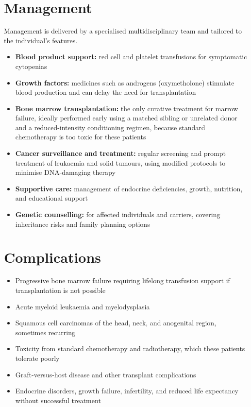 \section*{Management}
Management is delivered by a specialised multidisciplinary team and tailored to the individual's features.
\begin{itemize}
    \item \textbf{Blood product support:} red cell and platelet transfusions for symptomatic cytopenias
    \item \textbf{Growth factors:} medicines such as androgens (oxymetholone) stimulate blood production and can delay the need for transplantation
    \item \textbf{Bone marrow transplantation:} the only curative treatment for marrow failure, ideally performed early using a matched sibling or unrelated donor and a reduced-intensity conditioning regimen, because standard chemotherapy is too toxic for these patients
    \item \textbf{Cancer surveillance and treatment:} regular screening and prompt treatment of leukaemia and solid tumours, using modified protocols to minimise DNA-damaging therapy
    \item \textbf{Supportive care:} management of endocrine deficiencies, growth, nutrition, and educational support
    \item \textbf{Genetic counselling:} for affected individuals and carriers, covering inheritance risks and family planning options
\end{itemize}

\section*{Complications}
\begin{itemize}
    \item Progressive bone marrow failure requiring lifelong transfusion support if transplantation is not possible
    \item Acute myeloid leukaemia and myelodysplasia
    \item Squamous cell carcinomas of the head, neck, and anogenital region, sometimes recurring
    \item Toxicity from standard chemotherapy and radiotherapy, which these patients tolerate poorly
    \item Graft-versus-host disease and other transplant complications
    \item Endocrine disorders, growth failure, infertility, and reduced life expectancy without successful treatment
\end{itemize}

